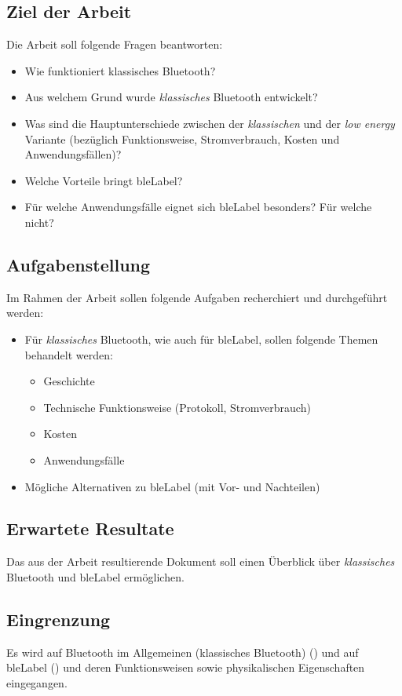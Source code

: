 \subsection{Ziel der Arbeit}
Die Arbeit soll folgende Fragen beantworten:
\begin{itemize}
	\item Wie funktioniert klassisches Bluetooth?
	\item Aus welchem Grund wurde \textit{klassisches} Bluetooth entwickelt?
	\item Was sind die Hauptunterschiede zwischen der \textit{klassischen} und der \textit{low energy} Variante (bezüglich Funktionsweise, Stromverbrauch, Kosten und Anwendungsfällen)?
	\item Welche Vorteile bringt \gls{bleLabel}?
	\item Für welche Anwendungsfälle eignet sich \gls{bleLabel} besonders? Für welche nicht?
\end{itemize}

\subsection{Aufgabenstellung}
Im Rahmen der Arbeit sollen folgende Aufgaben recherchiert und durchgeführt werden:
\begin{itemize}
	\item Für \textit{klassisches} Bluetooth, wie auch für \gls{bleLabel}, sollen folgende Themen behandelt werden:
	\begin{itemize}
		\item Geschichte
		\item Technische Funktionsweise (Protokoll, Stromverbrauch)
		\item Kosten
		\item Anwendungsfälle
	\end{itemize}
	\item Mögliche Alternativen zu \gls{bleLabel} (mit Vor- und Nachteilen)
\end{itemize}

\subsection{Erwartete Resultate}
Das aus der Arbeit resultierende Dokument soll einen Überblick über \textit{klassisches} Bluetooth und \gls{bleLabel} ermöglichen.

\subsection{Eingrenzung}
Es wird auf Bluetooth im Allgemeinen (klassisches Bluetooth) () und auf \gls{bleLabel} () und deren Funktionsweisen sowie physikalischen Eigenschaften eingegangen.

